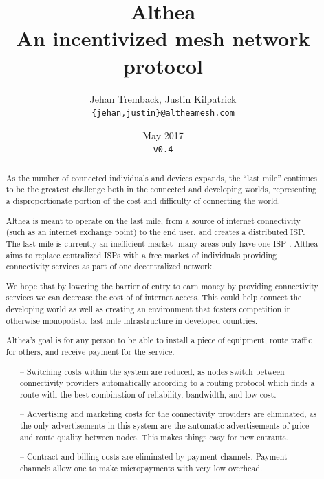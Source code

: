 \documentclass[11pt]{article}
\title{%
  \textbf{Althea} \\
	\vspace{3pt}
  \large An incentivized mesh network protocol}
\author{Jehan Tremback, Justin Kilpatrick\\
\texttt{\{jehan,justin\}@altheamesh.com}\\}
\date{May 2017\\
\texttt{v0.4}}
\begin{document}
\maketitle

\begin{abstract}

As the number of connected individuals and devices expands, the ``last mile'' continues to be the greatest challenge both in the connected and developing worlds, representing a disproportionate portion of the cost and difficulty of connecting the world.
 
Althea is meant to operate on the last mile, from a source of internet connectivity (such as an internet exchange point) to the end user, and creates a distributed ISP. The last mile is currently an inefficient market- many areas only have one ISP \cite{fcc}. Althea aims to replace centralized ISPs with a free market of individuals providing connectivity services as part of one decentralized network.
 
We hope that by lowering the barrier of entry to earn money by providing connectivity services we can decrease the cost of of internet access. This could help connect the developing world as well as creating an environment that fosters competition in otherwise monopolistic last mile infrastructure in developed countries.
 
Althea’s goal is for any person to be able to install a piece of equipment, route traffic for others, and receive payment for the service.

\begin{itemize}
\item[--] Switching costs within the system are reduced, as nodes switch between connectivity providers automatically according to a routing protocol which finds a route with the best combination of reliability, bandwidth, and low cost.
 
\item[--] Advertising and marketing costs for the connectivity providers are eliminated, as the only advertisements in this system are the automatic advertisements of price and route quality between nodes. This makes things easy for new entrants.
 
\item[--] Contract and billing costs are eliminated by payment channels. Payment channels allow one to make micropayments with very low overhead.
\end{itemize}

\end{abstract}
\end{document}
